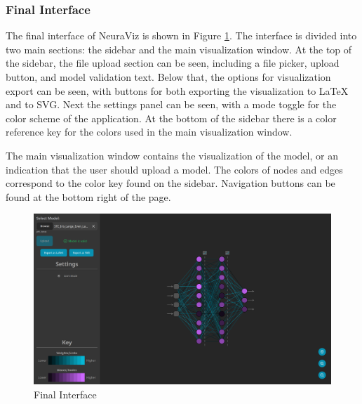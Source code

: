 \subsubsection{Final Interface}
The final interface of NeuraViz is shown in Figure \ref{fig:ui_final}. The interface is divided into two main sections: the sidebar and the main visualization window. At the top of the sidebar, the file upload section can be seen, including a file picker, upload button, and model validation text. Below that, the options for visualization export can be seen, with buttons for both exporting the visualization to \LaTeX{} and to SVG. Next the settings panel can be seen, with a mode toggle for the color scheme of the application. At the bottom of the sidebar there is a color reference key for the colors used in the main visualization window. 

The main visualization window contains the visualization of the model, or an indication that the user should upload a model. The colors of nodes and edges correspond to the color key found on the sidebar. Navigation buttons can be found at the bottom right of the page.

\begin{figure}[ht]
    \centering
    \includegraphics[width=1\textwidth]{03_design/res/final_interface.png}
    \caption{Final Interface}
    \label{fig:ui_final}
\end{figure}

